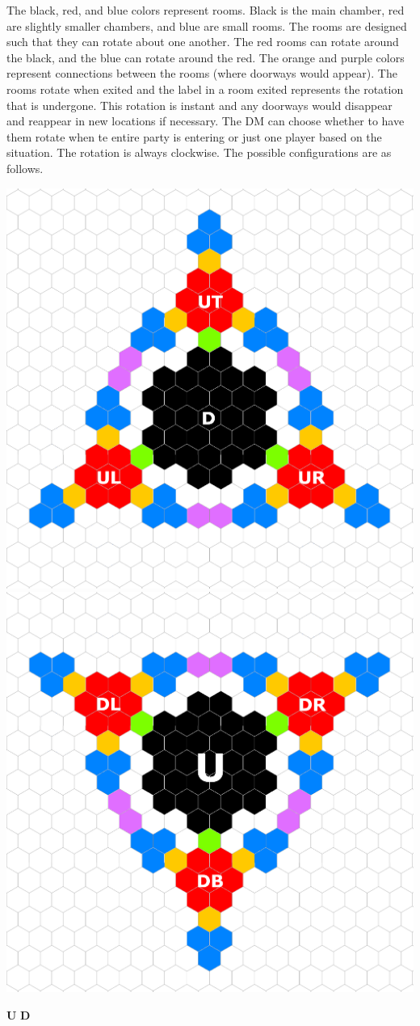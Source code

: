 The black, red, and blue colors represent rooms. Black is the main chamber, red are slightly smaller chambers, and blue are small rooms. The rooms are designed such that they can rotate about one another. The red rooms can rotate around the black, and the blue can rotate around the red. The orange and purple colors represent connections between the rooms (where doorways would appear). The rooms rotate when exited and the label in a room exited represents the rotation that is undergone. This rotation is instant and any doorways would disappear and reappear in new locations if necessary. The DM can choose whether to have them rotate when te entire party is entering or just one player based on the situation. The rotation is always clockwise. The possible configurations are as follows.

\begin{center}
	\includegraphics[width=0.45\linewidth]{img/Aethereu/U.png}
	\includegraphics[width=0.45\linewidth]{img/Aethereu/D.png}
	
	\textbf{U} \hspace{3cm} \textbf{D}
	

\end{center}
